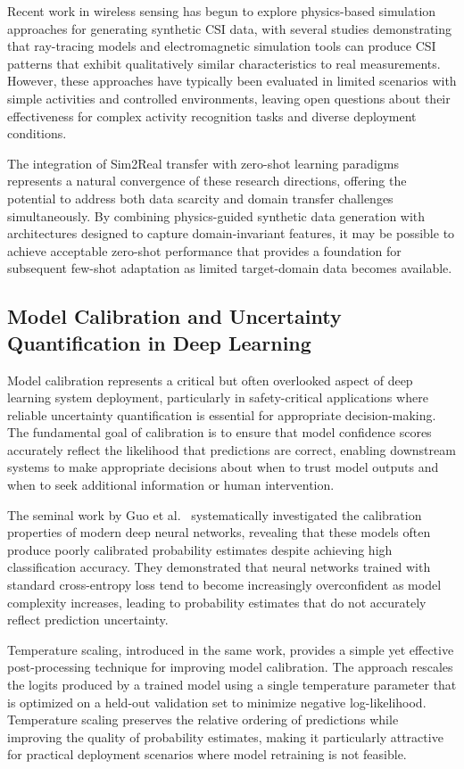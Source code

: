 \documentclass[journal]{IEEEtran}
\begin{document}
Recent work in wireless sensing has begun to explore physics-based simulation approaches for generating synthetic CSI data, with several studies demonstrating that ray-tracing models and electromagnetic simulation tools can produce CSI patterns that exhibit qualitatively similar characteristics to real measurements. However, these approaches have typically been evaluated in limited scenarios with simple activities and controlled environments, leaving open questions about their effectiveness for complex activity recognition tasks and diverse deployment conditions.

The integration of Sim2Real transfer with zero-shot learning paradigms represents a natural convergence of these research directions, offering the potential to address both data scarcity and domain transfer challenges simultaneously. By combining physics-guided synthetic data generation with architectures designed to capture domain-invariant features, it may be possible to achieve acceptable zero-shot performance that provides a foundation for subsequent few-shot adaptation as limited target-domain data becomes available.

\subsection{Model Calibration and Uncertainty Quantification in Deep Learning}

Model calibration represents a critical but often overlooked aspect of deep learning system deployment, particularly in safety-critical applications where reliable uncertainty quantification is essential for appropriate decision-making. The fundamental goal of calibration is to ensure that model confidence scores accurately reflect the likelihood that predictions are correct, enabling downstream systems to make appropriate decisions about when to trust model outputs and when to seek additional information or human intervention.

The seminal work by Guo et al.~\cite{calibration_guo2017} systematically investigated the calibration properties of modern deep neural networks, revealing that these models often produce poorly calibrated probability estimates despite achieving high classification accuracy. They demonstrated that neural networks trained with standard cross-entropy loss tend to become increasingly overconfident as model complexity increases, leading to probability estimates that do not accurately reflect prediction uncertainty.

Temperature scaling, introduced in the same work, provides a simple yet effective post-processing technique for improving model calibration. The approach rescales the logits produced by a trained model using a single temperature parameter that is optimized on a held-out validation set to minimize negative log-likelihood. Temperature scaling preserves the relative ordering of predictions while improving the quality of probability estimates, making it particularly attractive for practical deployment scenarios where model retraining is not feasible.
\end{document}
